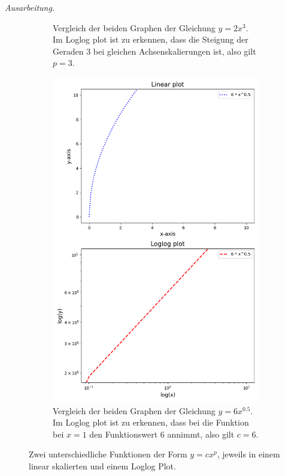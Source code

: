 \documentclass[titlepage]{article}
\newenvironment{ausarbeitung}{\vspace{3mm}\noindent\textit{Ausarbeitung.}}{}
\begin{document}
\begin{ausarbeitung}
\begin{figure}
\begin{subfigure}{0.46\textwidth}
			\caption{Vergleich der beiden Graphen der Gleichung $y = 2x^3$. Im Loglog plot ist zu erkennen, dass die Steigung der Geraden $3$ bei gleichen Achsenskalierungen ist, also gilt $p = 3$.}
			\label{fig:loglog_plot_a}
		\end{subfigure}
		\hfill
		\begin{subfigure}{0.46\textwidth}
			\includegraphics[width=\textwidth]{images/loglog_plot_b}
			\caption{Vergleich der beiden Graphen der Gleichung $y = 6x^{0.5}$. Im Loglog plot ist zu erkennen, dass bei die Funktion bei $x=1$ den Funktionswert $6$ annimmt, also gilt $c = 6$.}
			\label{fig:loglog_plot_b}
		\end{subfigure}
		
		\caption{Zwei unterschiedliche Funktionen der Form $y = cx^p$, jeweils in einem linear skalierten und einem Loglog Plot.}
		\label{fig:loglog_plot}
	\end{figure}
	
\end{ausarbeitung}
\newpage
\end{document}
